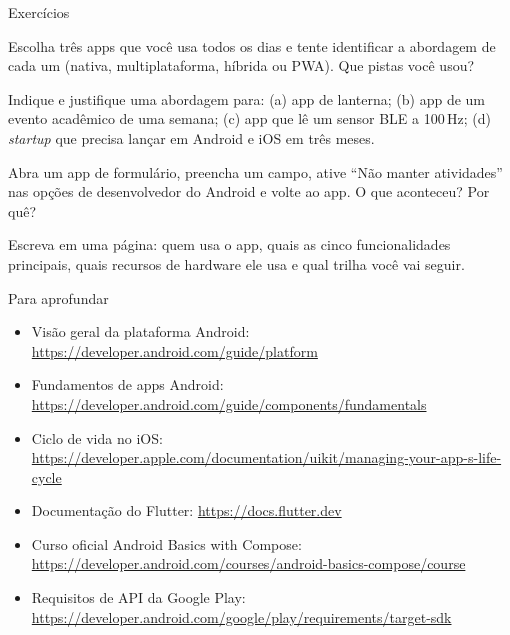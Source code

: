 \documentclass[aspectratio=169,10pt]{beamer}
\begin{document}
\begin{frame}{Exercícios}
  \begin{exercicio}
    Escolha três apps que você usa todos os dias e tente identificar a abordagem de cada um (nativa, multiplataforma, híbrida ou PWA). Que pistas você usou?
  \end{exercicio}
  \begin{exercicio}
    Indique e justifique uma abordagem para: (a) app de lanterna; (b) app de um evento acadêmico de uma semana; (c) app que lê um sensor BLE a 100\,Hz; (d) \emph{startup} que precisa lançar em Android e iOS em três meses.
  \end{exercicio}
  \begin{exercicio}
    Abra um app de formulário, preencha um campo, ative ``Não manter atividades'' nas opções de desenvolvedor do Android e volte ao app. O que aconteceu? Por quê?
  \end{exercicio}
  \begin{projeto}
    Escreva em uma página: quem usa o app, quais as cinco funcionalidades principais, quais recursos de hardware ele usa e qual trilha você vai seguir.
  \end{projeto}
\end{frame}

\begin{frame}{Para aprofundar}
  \small
  \begin{itemize}
    \item Visão geral da plataforma Android: \url{https://developer.android.com/guide/platform}
    \item Fundamentos de apps Android: \url{https://developer.android.com/guide/components/fundamentals}
    \item Ciclo de vida no iOS: \url{https://developer.apple.com/documentation/uikit/managing-your-app-s-life-cycle}
    \item Documentação do Flutter: \url{https://docs.flutter.dev}
    \item Curso oficial Android Basics with Compose: \url{https://developer.android.com/courses/android-basics-compose/course}
    \item Requisitos de API da Google Play: \url{https://developer.android.com/google/play/requirements/target-sdk}
  \end{itemize}
\end{frame}
\end{document}
